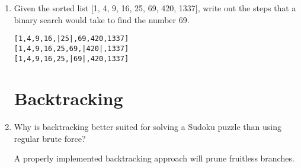 \documentclass[11pt]{article}
\newenvironment{answer}{\large\lstset{basicstyle=\tiny\ttfamily}\color{white}}{}
\newenvironment{answer}{\large\lstset{basicstyle=\large\ttfamily}\color{red}}{}
\begin{document}
\begin{enumerate}
\item Given the sorted list [1, 4, 9, 16, 25, 69, 420, 1337], write out the steps that a binary search would take to find the number 69.
\begin{answer}
\begin{lstlisting}
[1,4,9,16,|25|,69,420,1337]
[1,4,9,16,25,69,|420|,1337]
[1,4,9,16,25,|69|,420,1337]
\end{lstlisting}
\end{answer}


\section*{Backtracking}

\item Why is backtracking better suited for solving a Sudoku puzzle than
      using regular brute force?

\begin{answer}
A properly implemented backtracking approach will prune fruitless branches. 
\end{answer}

\end{enumerate}
\end{document}
